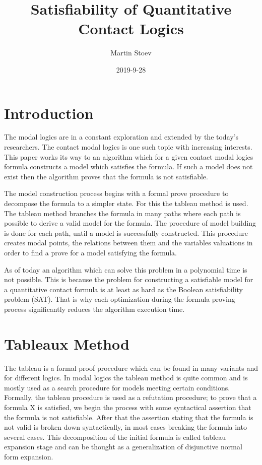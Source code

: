 \documentclass{article}
\title{Satisfiability of Quantitative Contact Logics}
\date{2019-9-28}
\author{Martin Stoev}
\begin{document}
	\maketitle
 	\thispagestyle{empty}
	\newpage

	\tableofcontents

	\newpage
	\section{Introduction}
	The modal logics are in a constant exploration and extended by the today's researchers. The contact modal logics is one such topic with increasing interests. This paper works its way to an algorithm which for a given contact modal logics formula constructs a model which satisfies the formula. If such a model does not exist then the algorithm proves that the formula is not satisfiable. 

The model construction process begins with a formal prove procedure to decompose the formula to a simpler state. For this the tableau method is used. The tableau method branches the formula in many paths where each path is possible to derive a valid model for the formula. The procedure of model building is done for each path, until a model is successfully constructed. This procedure creates modal points, the relations between them and the variables valuations in order to find a prove for a model satisfying the formula. 

As of today an algorithm which can solve this problem in a polynomial time is not possible. This is because the problem for constructing a satisfiable model for a quantitative contact formula is at least as hard as the Boolean satisfiability problem (SAT). That is why each optimization during the formula proving process significantly reduces the algorithm execution time.

	\newpage
	\section{Tableaux Method}
	The tableau is a formal proof procedure which can be found in many variants and for different logics. In modal logics the tableau method is quite common and is mostly used as a search procedure for models meeting certain conditions.
Formally, the tableau procedure is used as a refutation procedure; to prove that a formula X is satisfied, we begin the process with some syntactical assertion that the formula is not satisfiable. After that the assertion stating that the formula is not valid is broken down syntactically, in most cases breaking the formula into several cases. This decomposition of the initial formula is called tableau expansion stage and can be thought as a generalization of disjunctive normal form expansion. 
\end{document}
